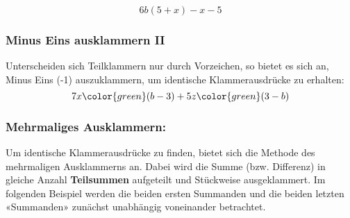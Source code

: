 \begin{beispiel}{}{}
$$6b(5+x) - x- 5$$

\end{beispiel}




\newpage



\subsubsection{Minus Eins ausklammern II}
Unterscheiden sich Teilklammern nur durch Vorzeichen, so bietet es
sich an, Minus Eins (-1) auszuklammern, um identische Klammerausdrücke
zu erhalten:
$$7x{\color{green}(b-3)} + 5z{\color{green}(3-b)}$$%










\newpage



\subsubsection{Mehrmaliges Ausklammern:}
 Um identische Klammerausdrücke zu finden, bietet sich die Methode des mehrmaligen Ausklammerns an.
 Dabei wird die Summe (bzw. Differenz) in gleiche Anzahl \textbf{Teilsummen} aufgeteilt und Stückweise ausgeklammert.
 Im folgenden Beispiel werden die beiden ersten Summanden und die beiden letzten «Summanden» zunächst unabhängig voneinander betrachtet.

